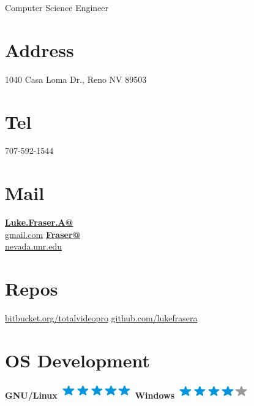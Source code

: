 \documentclass[]{friggeri-cv}
\begin{document}
      {Computer Science Engineer}
      

\begin{aside}
  \section{Address}
    1040 Casa Loma Dr.,
    Reno NV 89503
    ~
  \section{Tel}
    707-592-1544
    ~
  \section{Mail}
    \href{mailto:lukefrasera@gmail.com}{\textbf{Luke.Fraser.A@}\\gmail.com}
    \href{mailto:fraser@nevada.unr.edu}{\textbf{Fraser@}\\nevada.unr.edu}
    ~
  \section{Repos}
    \href{https://bitbucket.org/totalvideopro}{\footnotesize{bitbucket.org/totalvideopro}}
    \href{https://github.com/lukefrasera}{\footnotesize{github.com/lukefrasera}}    
    ~
  \section{OS Development}
    \textbf{GNU/Linux}\includegraphics[scale=0.40]{img/5stars.png}
    \textbf{Windows}\includegraphics[scale=0.40]{img/4stars.png}
    ~

\end{aside}
\end{document}

